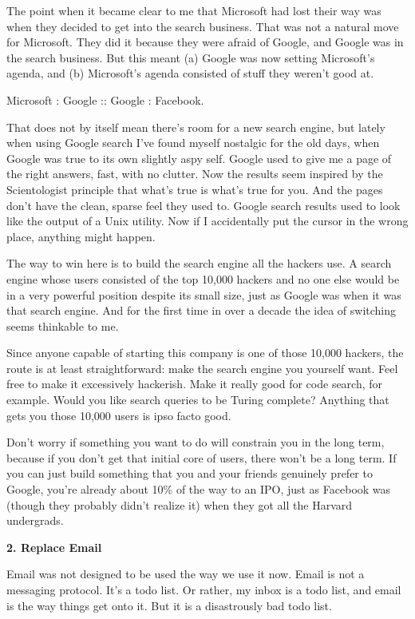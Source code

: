 The point when it became clear to me that Microsoft had lost their way
was when they decided to get into the search business. That was not a
natural move for Microsoft. They did it because they were afraid of
Google, and Google was in the search business. But this meant (a) Google
was now setting Microsoft's agenda, and (b) Microsoft's agenda consisted
of stuff they weren't good at.

Microsoft : Google :: Google : Facebook.

That does not by itself mean there's room for a new search engine, but
lately when using Google search I've found myself nostalgic for the old
days, when Google was true to its own slightly aspy self. Google used to
give me a page of the right answers, fast, with no clutter. Now the
results seem inspired by the Scientologist principle that what's true is
what's true for you. And the pages don't have the clean, sparse feel
they used to. Google search results used to look like the output of a
Unix utility. Now if I accidentally put the cursor in the wrong place,
anything might happen.

The way to win here is to build the search engine all the hackers use. A
search engine whose users consisted of the top 10,000 hackers and no one
else would be in a very powerful position despite its small size, just
as Google was when it was that search engine. And for the first time in
over a decade the idea of switching seems thinkable to me.

Since anyone capable of starting this company is one of those 10,000
hackers, the route is at least straightforward: make the search engine
you yourself want. Feel free to make it excessively hackerish. Make it
really good for code search, for example. Would you like search queries
to be Turing complete? Anything that gets you those 10,000 users is ipso
facto good.

Don't worry if something you want to do will constrain you in the long
term, because if you don't get that initial core of users, there won't
be a long term. If you can just build something that you and your
friends genuinely prefer to Google, you're already about 10\% of the way
to an IPO, just as Facebook was (though they probably didn't realize it)
when they got all the Harvard undergrads.

\textbf{2. Replace Email}

Email was not designed to be used the way we use it now. Email is not a
messaging protocol. It's a todo list. Or rather, my inbox is a todo
list, and email is the way things get onto it. But it is a disastrously
bad todo list.

